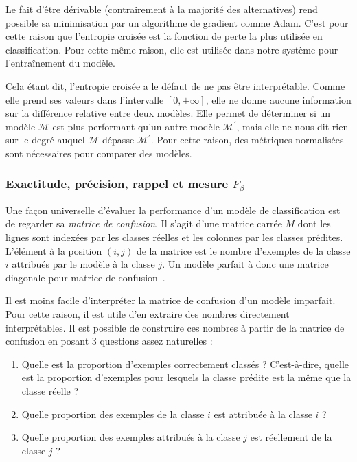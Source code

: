 Le fait d'être dérivable (contrairement à la majorité des alternatives)
rend possible sa minimisation par un algorithme de gradient comme Adam.
C'est pour cette raison que l'entropie croisée est la fonction de perte la plus utilisée en classification.
Pour cette même raison, elle est utilisée dans notre système pour l'entraînement du modèle.

Cela étant dit, l'entropie croisée a le défaut de ne pas être interprétable.
Comme elle prend ses valeurs dans l'intervalle \([0, +\infty]\), 
elle ne donne aucune information sur la différence relative entre deux modèles.
Elle permet de déterminer si un modèle \(\mathcal{M}\) est plus performant qu'un autre modèle \(\mathcal{M}^\prime\),
mais elle ne nous dit rien sur le degré auquel \(\mathcal{M}\) dépasse \(\mathcal{M}^\prime\).
Pour cette raison, des métriques normalisées sont nécessaires pour comparer des modèles.

\subsubsection{Exactitude, précision, rappel et mesure \(F_\beta\)}

Une façon universelle d'évaluer la performance d'un modèle de classification 
est de regarder sa \emph{matrice de confusion}.
Il s'agit d'une matrice carrée \(M\) 
dont les lignes sont indexées par les classes réelles et les colonnes par les classes prédites.
L'élément à la position \((i, j)\) de la matrice 
est le nombre d'exemples de la classe \(i\) attribués par le modèle à la classe \(j\).
Un modèle parfait à donc une matrice diagonale pour matrice de confusion~\cite{Raschka_Mirjalili_2017}.

Il est moins facile d'interpréter la matrice de confusion d'un modèle imparfait.
Pour cette raison, il est utile d'en extraire des nombres directement interprétables.
Il est possible de construire ces nombres à partir de la matrice de confusion 
en posant 3 questions assez naturelles :
\begin{enumerate}[label=(\arabic*)]
    \item Quelle est la proportion d'exemples correctement classés ? 
    C'est-à-dire, quelle est la proportion d'exemples pour lesquels 
    la classe prédite est la même que la classe réelle ?
    \item Quelle proportion des exemples de la classe \(i\) est attribuée à la classe \(i\) ?
    \item Quelle proportion des exemples attribués à la classe \(j\) est réellement de la classe \(j\) ?
\end{enumerate}

